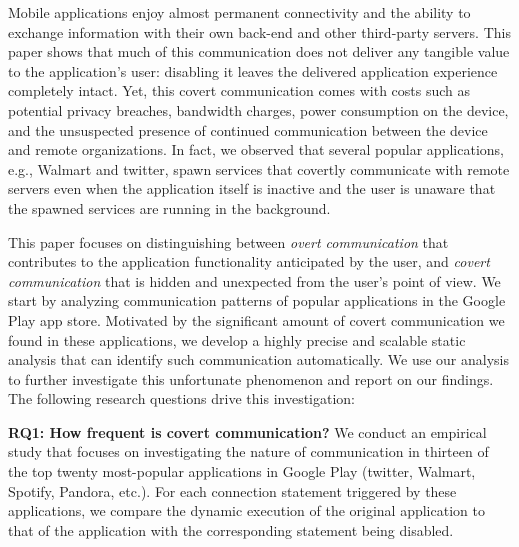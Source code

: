 Mobile applications enjoy almost permanent connectivity and the
ability to exchange information with their own back-end and other
third-party servers.  This paper shows that much of this communication
does not deliver any tangible value to the application's user:
disabling it leaves the delivered application experience completely
intact.  Yet, this covert communication comes with costs such as
potential privacy breaches, bandwidth charges, power consumption on
the device, and the unsuspected presence of continued communication
between the device and remote organizations. In fact, we observed that
several popular applications, e.g., Walmart and twitter, spawn
services that covertly communicate with remote servers even when the 
application itself is inactive and the user is unaware that the
spawned services are running in the background.


This paper focuses on distinguishing between 
\emph{overt communication} that contributes to the application functionality anticipated by the user, and
\emph{covert communication} that is hidden and unexpected from the user's point of view.
We start by
analyzing communication patterns of
popular applications in the Google Play app store. Motivated by the significant
amount of covert communication we found in these applications, 
we develop a highly precise and scalable static analysis that can identify 
such communication automatically. We use our analysis to further 
investigate this unfortunate phenomenon and report on our findings. 
The following research questions drive this investigation:

\noindent 
{\bf RQ1: How frequent is covert communication?} %
We conduct an empirical study that focuses on %
investigating the nature of communication in thirteen of the 
top twenty most-popular applications in Google Play (twitter, Walmart,
Spotify, Pandora, etc.).  
For each connection statement triggered by these applications, we compare the dynamic execution of the original application to that of the application with the corresponding statement being disabled. 

